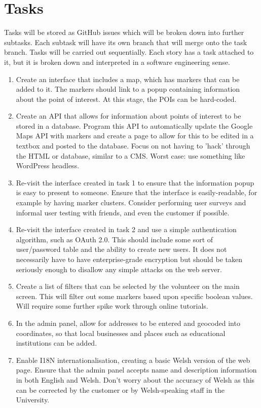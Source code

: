 \section{Tasks}

Tasks will be stored as GitHub issues which will be broken down into further subtasks. Each subtask will have its own branch that will merge onto the task branch. Tasks will be carried out sequentially. Each story has a task attached to it, but it is broken down and interpreted in a software engineering sense.

\begin{enumerate}
	\item	Create an interface that includes a map, which has markers that can be added to it. The markers should link to a popup containing information about the point of interest. At this stage, the POIs can be hard-coded.
	\item	Create an API that allows for information about points of interest to be stored in a database. Program this API to automatically update the Google Maps API with markers and create a page to allow for this to be edited in a textbox and posted to the database. Focus on not having to 'hack' through the HTML or database, similar to a CMS. Worst case: use something like WordPress headless.
	\item	Re-visit the interface created in task 1 to ensure that the information popup is easy to present to someone. Ensure that the interface is easily-readable, for example by having marker clusters. Consider performing user surveys and informal user testing with friends, and even the customer if possible.
	\item	Re-visit the interface created in task 2 and use a simple authentication algorithm, such as OAuth 2.0. This should include some sort of user/password table and the ability to create new users. It does not necessarily have to have enterprise-grade encryption but should be taken seriously enough to disallow any simple attacks on the web server.
	\item Create a list of filters that can be selected by the volunteer on the main screen. This will filter out some markers based upon specific boolean values. Will require some further spike work through online tutorials.
	\item In the admin panel, allow for addresses to be entered and geocoded into coordinates, so that local businesses and places such as educational institutions can be added.
	\item Enable I18N internationalisation, creating a basic Welsh version of the web page. Ensure that the admin panel accepts name and description information in both English and Welsh. Don't worry about the accuracy of Welsh as this can be corrected by the customer or by Welsh-speaking staff in the University.

\end{enumerate}
